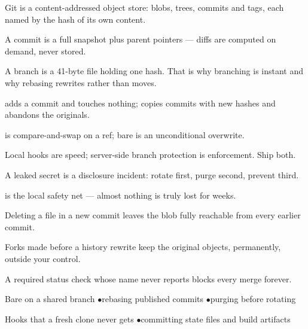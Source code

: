 
\begin{tickcheck}
  \item Git is a content-addressed object store: blobs, trees, commits and tags, each named by the hash of its own content.
  \item A commit is a full snapshot plus parent pointers --- diffs are computed on demand, never stored.
  \item A branch is a 41-byte file holding one hash. That is why branching is instant and why rebasing rewrites rather than moves.
  \item {} adds a commit and touches nothing;  copies commits with new hashes and abandons the originals.
  \item {} is compare-and-swap on a ref; bare  is an unconditional overwrite.
  \item Local hooks are speed; server-side branch protection is enforcement. Ship both.
  \item A leaked secret is a disclosure incident: rotate first, purge second, prevent third.
\end{tickcheck}

\begin{wbitem}
  \item {} is the local safety net --- almost nothing is truly lost for weeks.
  \item Deleting a file in a new commit leaves the blob fully reachable from every earlier commit.
  \item Forks made before a history rewrite keep the original objects, permanently, outside your control.
  \item A required status check whose name never reports blocks every merge forever.
\end{wbitem}

\begin{wbitem}
  \item Bare  on a shared branch \quad$\bullet$\quad rebasing published commits \quad$\bullet$\quad purging before rotating
  \item Hooks that a fresh clone never gets \quad$\bullet$\quad committing state files and build artifacts
\end{wbitem}

